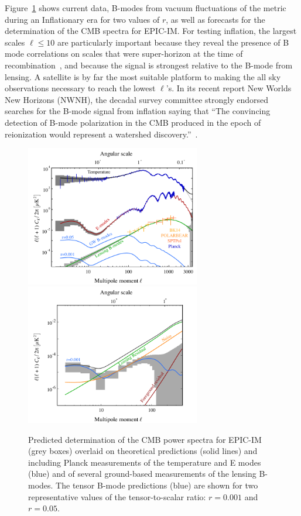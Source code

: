 Figure~\ref{fig:clall} shows current data, B-modes from vacuum fluctuations of the metric during an Inflationary 
era for two values of $r$, as well as forecasts for the determination of the \ac{CMB} spectra for EPIC-IM. For testing inflation, the largest scales $\ell \leq 10$ are particularly important because they reveal 
the presence of B mode correlations on scales that were super-horizon at the time of recombination~\cite{Lee:2014cya}, 
and because the signal is strongest relative to the B-mode from lensing. A satellite is by far the most suitable 
platform to making the all sky observations necessary to reach the lowest $\ell$'s. In its recent report New Worlds New Horizons (NWNH), the decadal survey committee 
strongly endorsed searches for the B-mode signal from inflation saying that ``The convincing detection of 
B-mode polarization in the CMB produced in the epoch of reionization would represent a watershed discovery.''~\cite{blandford2010}. 
\vspace{-0.1in}
\begin{figure}[ht!]
\begin{center}
\includegraphics[width=3in]{figs/cmb_powspec_v1.pdf}  
\includegraphics[width=3in]{figs/cmbbb_powspec_v1.pdf}
\end{center}
\vspace{-0.25in}
\caption{ \small \setlength{\baselineskip}{0.95\baselineskip}
Predicted determination of the \ac{CMB} power spectra for EPIC-IM (grey boxes) overlaid
on theoretical predictions (solid lines) and including Planck measurements of the 
temperature and E modes (blue) and of several ground-based measurements 
of the lensing B-modes.  The tensor B-mode predictions (blue) are shown 
for two representative values of the tensor-to-scalar
ratio: $r=0.001$ and $r=0.05.$ 
\label{fig:clall} }
\vspace{-0.05in}
\end{figure}

